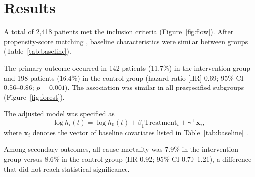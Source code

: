 \section{Results}
\label{sec:results}

A total of 2,418 patients met the inclusion criteria (Figure~\ref{fig:flow}). After propensity-score matching \cite{austin2011introduction}, baseline characteristics were similar between groups (Table~\ref{tab:baseline}).

The primary outcome occurred in 142 patients (11.7\%) in the intervention group and 198 patients (16.4\%) in the control group (hazard ratio [HR] 0.69; 95\% CI 0.56--0.86; $p = 0.001$). The association was similar in all prespecified subgroups (Figure~\ref{fig:forest}).

The adjusted model was specified as
\begin{equation}
  \log h_i(t) = \log h_0(t) + \beta_1 \text{Treatment}_i + \boldsymbol{\gamma}^\top \mathbf{x}_i ,
  \label{eq:cox}
\end{equation}
where $\mathbf{x}_i$ denotes the vector of baseline covariates listed in Table~\ref{tab:baseline} \cite{cox1972regression, therneau2000modeling}.

Among secondary outcomes, all-cause mortality was 7.9\% in the intervention group versus 8.6\% in the control group (HR 0.92; 95\% CI 0.70--1.21), a difference that did not reach statistical significance.
